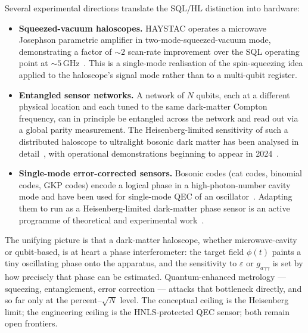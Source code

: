 \begin{application}
\label{app:dm-hl}
Several experimental directions translate the SQL/HL
distinction into hardware:
\begin{itemize}
  \item \textbf{Squeezed-vacuum haloscopes.} HAYSTAC operates
        a microwave Josephson parametric amplifier in
        two-mode-squeezed-vacuum mode, demonstrating a factor of
        $\sim 2$ scan-rate improvement over the SQL operating
        point at $\sim 5$\,GHz~\cite{malnou2019,haystac2021}.
        This is a single-mode realisation of the spin-squeezing
        idea applied to the haloscope's signal mode rather than
        to a multi-qubit register.
  \item \textbf{Entangled sensor networks.} A network of
        $N$ qubits, each at a different physical location and
        each tuned to the same dark-matter Compton frequency,
        can in principle be entangled across the network and
        read out via a global parity measurement. The
        Heisenberg-limited sensitivity of such a distributed
        haloscope to ultralight bosonic dark matter has been
        analysed in detail~\cite{brady2022},
        with operational demonstrations beginning to appear in
        2024~\cite{liu2024,connolly2024}.
  \item \textbf{Single-mode error-corrected sensors.}
        Bosonic codes (cat codes, binomial codes, GKP codes)
        encode a logical phase in a high-photon-number cavity
        mode and have been used for single-mode QEC of an
        oscillator~\cite{ofek2016,sivak2023}. Adapting them to
        run as a Heisenberg-limited dark-matter phase sensor
        is an active programme of theoretical and experimental
        work~\cite{layden2019}.
\end{itemize}
The unifying picture is that a dark-matter haloscope, whether
microwave-cavity or qubit-based, is at heart a phase
interferometer: the target field $\phi(t)$ paints a tiny
oscillating phase onto the apparatus, and the sensitivity to
$\varepsilon$ or $g_{a\gamma\gamma}$ is set by how
precisely that phase can be estimated. Quantum-enhanced
metrology --- squeezing, entanglement, error correction ---
attacks that bottleneck directly, and so far only at the
percent--$\sqrt N$ level. The conceptual ceiling is the
Heisenberg limit; the engineering ceiling is the HNLS-protected
QEC sensor; both remain open frontiers.
\end{application}

